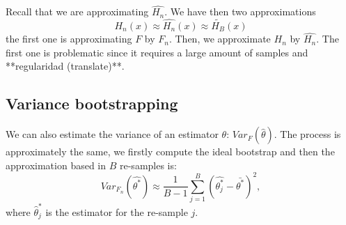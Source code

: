 Recall that we are approximating $\hat{H_n}$. We have then two approximations
\[
H_n(x) \approx \hat{H_n}(x) \approx \tilde{H_B}(x)
\]
the first one is approximating $F$ by $F_n$. Then, we approximate $H_n$ by $\hat{H_n}$. The first one is problematic since it requires a large amount of samples and **regularidad (translate)**.

\subsection{ Variance bootstrapping}

We can also estimate the variance of an estimator $\theta$: $Var_F(\hat \theta)$. The process is approximately the same, we firstly compute the ideal bootstrap and then the approximation based in $B$ re-samples is:
\[
Var_{F_n}(\hat{\theta^*}) \approx \frac{1}{B-1} \sum_{j=1}^B(\hat{\theta^*_j} - \bar{\theta^*})^2,
\]
where $\hat \theta^*_j$ is the estimator for the re-sample $j$.
